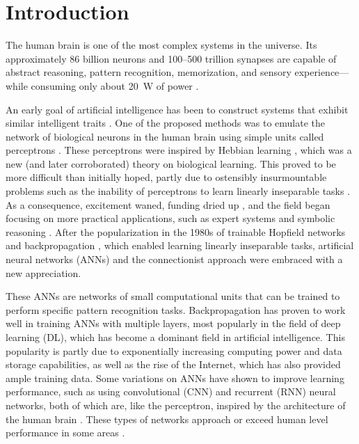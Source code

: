 \chapter{Introduction}\label{ch:introduction}

The human brain is one of the most complex systems in the universe.
Its approximately 86 billion neurons \citep{azevedo2009equal} and 100--500 trillion synapses \citep{drachman2005we} are capable of abstract reasoning, pattern recognition, memorization, and sensory experience---while consuming only about \SI{20}{\watt} of power \citep{sokoloff1960metabolism,drubach2000brain}.

An early goal of artificial intelligence has been to construct systems that exhibit similar intelligent traits \citep{turing1948intelligent}.
One of the proposed methods was to emulate the network of biological neurons in the human brain using simple units called perceptrons \citep{rosenblatt1958perceptron}.
These perceptrons were inspired by Hebbian learning \citep{hebb1949organization}, which was a new (and later corroborated) theory on biological learning.
This proved to be more difficult than initially hoped, partly due to ostensibly insurmountable problems such as the inability of perceptrons to learn linearly inseparable tasks \citep{minsky2017perceptrons}.
As a consequence, excitement waned, funding dried up \citep{crevier1993ai}, and the field began focusing on more practical applications, such as expert systems and symbolic reasoning \citep{haugeland1985artificial}.
After the popularization in the 1980s of trainable Hopfield networks \citep{hopfield1982neural} and backpropagation \citep{rumelhart1986learning}, which enabled learning linearly inseparable tasks, artificial neural networks (ANNs) and the connectionist approach were embraced with a new appreciation.

These ANNs are networks of small computational units that can be trained to perform specific pattern recognition tasks.
Backpropagation has proven to work well in training ANNs with multiple layers, most popularly in the field of deep learning (DL), which has become a dominant field in artificial intelligence.
This popularity is partly due to exponentially increasing computing power and data storage capabilities, as well as the rise of the Internet, which has also provided ample training data.
Some variations on ANNs have shown to improve learning performance, such as using convolutional (CNN) and recurrent (RNN) neural networks, both of which are, like the perceptron, inspired by the architecture of the human brain \citep{hubel1968receptive, fukushima1982neocognitron,lecun1995convolutional,lukovsevivcius2009reservoir}.
These types of networks approach or exceed human level performance in some areas \citep{schmidhuber2015deep}.


